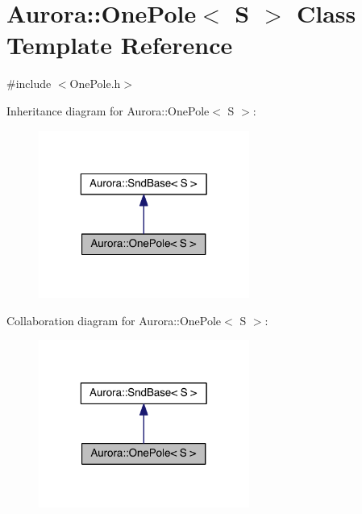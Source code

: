 \hypertarget{class_aurora_1_1_one_pole}{}\section{Aurora\+:\+:One\+Pole$<$ S $>$ Class Template Reference}
\label{class_aurora_1_1_one_pole}


{\ttfamily \#include $<$One\+Pole.\+h$>$}



Inheritance diagram for Aurora\+:\+:One\+Pole$<$ S $>$\+:
\nopagebreak
\begin{figure}[H]
\begin{center}
\leavevmode
\includegraphics[width=196pt]{class_aurora_1_1_one_pole__inherit__graph}
\end{center}
\end{figure}


Collaboration diagram for Aurora\+:\+:One\+Pole$<$ S $>$\+:
\nopagebreak
\begin{figure}[H]
\begin{center}
\leavevmode
\includegraphics[width=196pt]{class_aurora_1_1_one_pole__coll__graph}
\end{center}
\end{figure}
